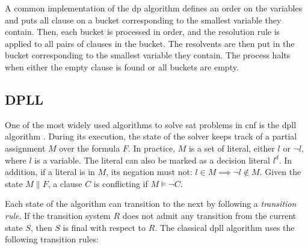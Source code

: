 A common implementation of the \gls{dp} algorithm defines an order on the variables and puts all clause on a bucket corresponding to the smallest variable they contain.
Then, each bucket is processed in order, and the resolution rule is applied to all pairs of clauses in the bucket.
The resolvents are then put in the bucket corresponding to the smallest variable they contain.
The process halts when either the empty clause is found or all buckets are empty.

\subsection*{DPLL}

One of the most widely used algorithms to solve \gls{sat} problems in \gls{cnf} is the \gls{dpll} algorithm \cite{paper:dpll}.
During its execution, the state of the solver keeps track of a partial assignment $M$ over the formula $F$.
In practice, $M$ is a set of literal, either $l$ or $\neg l$, where $l$ is a variable.
The literal can also be marked as a decision literal $l^d$.
In addition, if a literal is in $M$, its negation must not: $l \in M \implies \neg l \not\in M$.
Given the state $M \parallel F$, a clause $C$ is conflicting if $M \models \neg C$.

Each state of the algorithm can transition to the next by following a \textit{transition rule}.
If the transition system $R$ does not admit any transition from the current state $S$, then $S$ is final with respect to $R$.
The classical \gls{dpll} algorithm uses the following transition rules:

